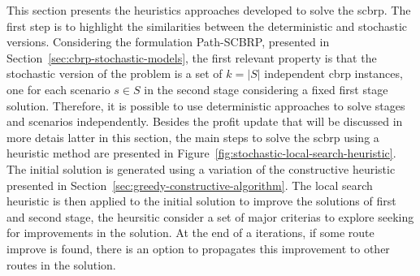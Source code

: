 This section presents the heuristics approaches developed to solve the \gls{scbrp}. The first step is to highlight the similarities between the deterministic and stochastic versions. Considering the formulation Path-SCBRP, presented in Section~\ref{sec:cbrp-stochastic-models}, the first relevant property is that the stochastic version of the problem is a set of $k = |S|$ independent \gls{cbrp} instances, one for each scenario $s \in S$ in the second stage considering a fixed first stage solution. Therefore, it is possible to use deterministic approaches to solve stages and scenarios independently. Besides the profit update that will be discussed in more detais latter in this section, the main steps to solve the \gls{scbrp} using a heuristic method are presented in Figure~\ref{fig:stochastic-local-search-heuristic}. The initial solution is generated using a variation of the constructive heuristic presented in Section~\ref{sec:greedy-constructive-algorithm}. The local search heuristic is then applied to the initial solution to improve the solutions of first and second stage, the heursitic consider a set of major criterias to explore seeking for improvements in the solution. At the end of a iterations, if some route improve is found, there is an option to propagates this improvement to other routes in the solution.


